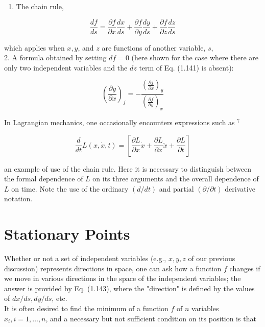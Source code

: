 \documentclass[10pt]{article}
\begin{document}
\begin{enumerate}
  \item The chain rule,
\end{enumerate}


\begin{equation*}
\frac{d f}{d s}=\frac{\partial f}{\partial x} \frac{d x}{d s}+\frac{\partial f}{\partial y} \frac{d y}{d s}+\frac{\partial f}{\partial z} \frac{d z}{d s} \tag{1.143}
\end{equation*}


which applies when $x, y$, and $z$ are functions of another variable, $s$,\\
2. A formula obtained by setting $d f=0$ (here shown for the case where there are only two independent variables and the $d z$ term of Eq. (1.141) is absent):


\begin{equation*}
\left(\frac{\partial y}{\partial x}\right)_{f}=-\frac{\left(\frac{\partial f}{\partial x}\right)_{y}}{\left(\frac{\partial f}{\partial y}\right)_{x}} \tag{1.144}
\end{equation*}


In Lagrangian mechanics, one occasionally encounters expressions such as ${ }^{7}$

$$
\frac{d}{d t} L(x, \dot{x}, t)=\left[\frac{\partial L}{\partial x} \dot{x}+\frac{\partial L}{\partial \dot{x}} \ddot{x}+\frac{\partial L}{\partial t}\right]
$$

an example of use of the chain rule. Here it is necessary to distinguish between the formal dependence of $L$ on its three arguments and the overall dependence of $L$ on time. Note the use of the ordinary $(d / d t)$ and partial $(\partial / \partial t)$ derivative notation.

\section*{Stationary Points}
Whether or not a set of independent variables (e.g., $x, y, z$ of our previous discussion) represents directions in space, one can ask how a function $f$ changes if we move in various directions in the space of the independent variables; the answer is provided by Eq. (1.143), where the "direction" is defined by the values of $d x / d s, d y / d s$, etc.\\
It is often desired to find the minimum of a function $f$ of $n$ variables $x_{i}, i=1, \ldots, n$, and a necessary but not sufficient condition on its position is that
\end{document}
